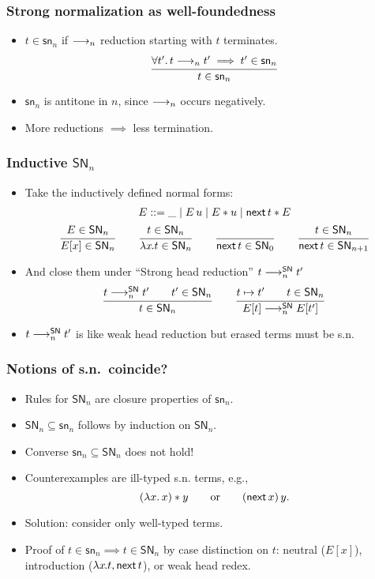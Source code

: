 \documentclass[t]{beamer}
\newcommand{\mybox}[1]{\mbox{\color{black}#1}}
\newcommand{\nex}{\tnext\,}
\newcommand{\redSN}{\red^\SN}
\renewcommand{\sn}{\mathsf{sn}}
\renewcommand{\SN}{\mathsf{SN}}
\begin{document}
\begin{frame}%
  \frametitle{Strong normalization as well-foundedness}
  \begin{itemize}
  \item $t \in \sn_n$ if $\longrightarrow_n$ reduction starting with $t$
    terminates.
\[
  \ru{\forall t'.\, t \red_n t' \implies t' \in \sn_n
    }{t \in \sn_n}
\]
  \item $\sn_n$ is antitone in $n$, since $\longrightarrow_n$ occurs negatively.
  \item More reductions $\implies$ less termination.
  \end{itemize}
\end{frame}


\begin{frame}
  \frametitle{Inductive $\SN_n$}
  \vspace{-15pt}
  \begin{itemize}
  \item Take the inductively defined normal forms:
\begin{gather*}
  E ::= \_ \mid E\,u \mid E \ast u \mid \nex t \ast E\\
  \ru{E \in \SN_n
    }{E[x] \in \SN_n}
\qquad
  \ru{t\in\SN_n}{\lam x t \in \SN_n}
\qquad
  \ru{}{\nex t \in \SN_0}
\qquad
  \ru{t \in \SN_n
    }{\nex t \in \SN_{n+1}}
\end{gather*}
\item And close them under ``Strong head reduction'' $t \redSN_n t'$
\begin{gather*}
\ru{t \redSN_n t' \qquad t' \in \SN_n }
   {t \in \SN_n}\qquad
\ru{t \contr t' \qquad t \in \SN_n}
   {E[t] \redSN_n E[t']}
\end{gather*}
\item $t \redSN_n t'$ is like weak head reduction but erased terms must be s.n.
\end{itemize}
\end{frame}

\begin{frame}%
  \frametitle{Notions of s.n.\ coincide?}
  \begin{itemize}
  \item Rules for $\SN_n$ are closure properties of $\sn_n$.
  \item $\SN_n \subseteq \sn_n$ follows by induction on $\SN_n$.
  \item Converse $\sn_n \subseteq \SN_n$ does not hold!
  \item Counterexamples are ill-typed s.n. terms, e.g.,
\[
  (\lambda x.\, x) \ast y
\qquad \mybox{or}\qquad
  (\nex x)\,y
.\]
  \item Solution: consider only well-typed terms.
  \item Proof of $t \in \sn_n \implies t \in \SN_n$ by case
    distinction on $t$: neutral ($E[x]$), introduction ($\lam
    x t, \nex t$), or weak head redex.
  \end{itemize}
\end{frame}
\end{document}
